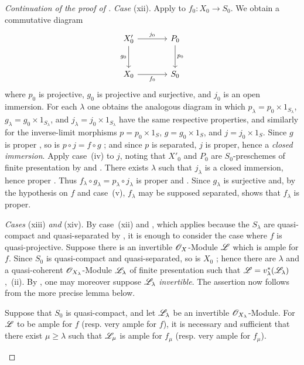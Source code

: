 \begin{proof}[Continuation of the proof of ]
\emph{Case} (xii). Apply  to $f_0:X_0\to S_0$. We obtain a commutative diagram
\[
\begin{tikzcd}[column sep=large,row sep=large]
X'_0 \arrow[r,"j_0"] \arrow[d,"g_0"'] & P_0 \arrow[d,"p_0"] \\
X_0 \arrow[r,"f_0"'] & S_0
\end{tikzcd}
\]
where $p_0$ is projective, $g_0$ is projective and surjective, and $j_0$ is an open immersion. For each $\lambda$ one obtains the analogous diagram in which $p_\lambda=p_0\times1_{S_\lambda}$, $g_\lambda=g_0\times1_{S_\lambda}$, and $j_\lambda=j_0\times1_{S_\lambda}$ have the same respective properties, and similarly for the inverse-limit morphisms $p=p_0\times1_S$, $g=g_0\times1_S$, and $j=j_0\times1_S$. Since $g$ is proper , so is $p\circ j=f\circ g$ ; and since $p$ is separated, $j$ is proper, hence a \emph{closed immersion}. Apply case~(iv) to $j$, noting that $X'_0$ and $P_0$ are $S_0$-preschemes of finite presentation by  and . There exists $\lambda$ such that $j_\lambda$ is a closed immersion, hence proper . Thus $f_\lambda\circ g_\lambda=p_\lambda\circ j_\lambda$
is proper  and . Since $g_\lambda$ is surjective and, by the hypothesis on $f$ and case~(v), $f_\lambda$ may be supposed separated,  shows that $f_\lambda$ is proper.

\emph{Cases} (xiii) \emph{and} (xiv). By case~(xii) and , which applies because the $S_\lambda$ are quasi-compact and quasi-separated by , it is enough to consider the case where $f$ is quasi-projective. Suppose there is an invertible $\mathscr{O}_X$-Module $\mathscr{L}$ which is ample for $f$. Since $S_0$ is quasi-compact and quasi-separated, so is $X_0$ ; hence there are $\lambda$ and a quasi-coherent $\mathscr{O}_{X_\lambda}$-Module $\mathscr{L}_\lambda$ of finite presentation such that $\mathscr{L}=v_\lambda^*(\mathscr{L}_\lambda)$ ,~(ii). By , one may moreover suppose $\mathscr{L}_\lambda$ \emph{invertible}. The assertion now follows from the more precise lemma below.

\begin{lemma}[8.10.5.2]
\label{IV.8.10.5.2}
Suppose that $S_0$ is quasi-compact, and let $\mathscr{L}_\lambda$ be an invertible $\mathscr{O}_{X_\lambda}$-Module. For $\mathscr{L}$ to be ample for $f$ \textup{(resp.} very ample for $f$\textup{)}, it is necessary and sufficient that there exist $\mu\geqslant\lambda$ such that $\mathscr{L}_\mu$ is ample for $f_\mu$ \textup{(resp.} very ample for $f_\mu$\textup{)}.
\end{lemma}


\end{proof}
